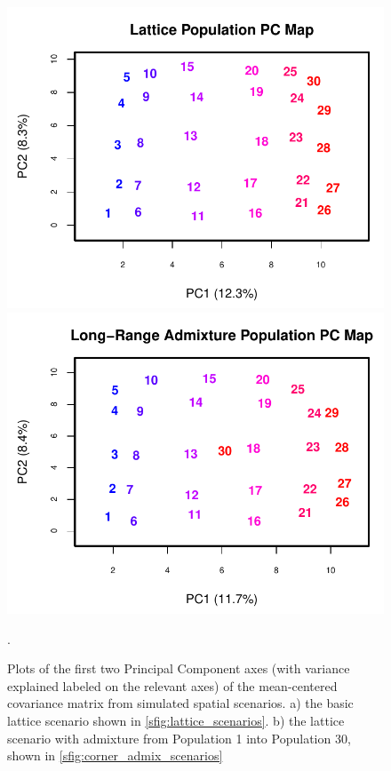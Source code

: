\documentclass[10pt,letterpaper]{article}
\begin{document}
\begin{figure}
\centering
	\subcaptionbox{\label{lattice_pc}}
		{\includegraphics[height=.45\textheight]{../figs/sims/lattice_PC_map.pdf}}
	\subcaptionbox{\label{cornerad_pc}}
			{\includegraphics[height=.45\textheight]{../figs/sims/corneradmixture_PC_map.pdf}}
	\caption{Plots of the first two Principal Component axes (with variance explained labeled on the relevant axes) 
			of the mean-centered covariance matrix from simulated spatial scenarios.
			a) the basic lattice scenario shown in \ref{sfig:lattice_scenarios}.
			b) the lattice scenario with admixture from Population 1 into Population 30, 
				shown in \ref{sfig:corner_admix_scenarios}}.
	\label{sfig:sim_pc_maps}
\end{figure}
\end{document}
